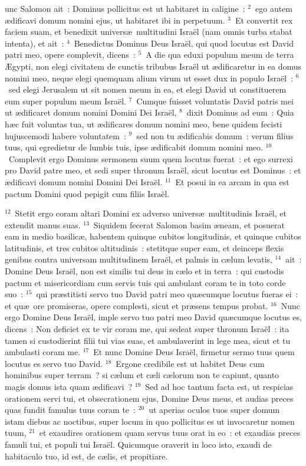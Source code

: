 \bchapter
{}unc Salomon ait~: Dominus pollicitus est ut habitaret in caligine~:
${}^{2}$~ego autem \ae dificavi domum nomini ejus, ut habitaret ibi in perpetuum.
${}^{3}$~Et convertit rex faciem suam, et benedixit univers\ae\ multitudini Isra\"el (nam omnis turba stabat intenta), et ait~:
${}^{4}$~Benedictus Dominus Deus Isra\"el, qui quod locutus est David patri meo, opere complevit, dicens~:
${}^{5}$~A die qua eduxi populum meum de terra \AE gypti, non elegi civitatem de cunctis tribubus Isra\"el ut \ae dificaretur in ea domus nomini meo, neque elegi quemquam alium virum ut esset dux in populo Isra\"el~:
${}^{6}$~sed elegi Jerusalem ut sit nomen meum in ea, et elegi David ut constituerem eum super populum meum Isra\"el.
${}^{7}$~Cumque fuisset voluntatis David patris mei ut \ae dificaret domum nomini Domini Dei Isra\"el,
${}^{8}$~dixit Dominus ad eum~: Quia h\ae c fuit voluntas tua, ut \ae dificares domum nomini meo, bene quidem fecisti hujuscemodi habere voluntatem~:
${}^{9}$~sed non tu \ae dificabis domum~: verum filius tuus, qui egredietur de lumbis tuis, ipse \ae dificabit domum nomini meo.
${}^{10}$~Complevit ergo Dominus sermonem suum quem locutus fuerat~: et ego surrexi pro David patre meo, et sedi super thronum Isra\"el, sicut locutus est Dominus~: et \ae dificavi domum nomini Domini Dei Isra\"el.
${}^{11}$~Et posui in ea arcam in qua est pactum Domini quod pepigit cum filiis Isra\"el.


${}^{12}$~Stetit ergo coram altari Domini ex adverso univers\ae\ multitudinis Isra\"el, et extendit manus suas.
${}^{13}$~Siquidem fecerat Salomon basim \ae neam, et posuerat eam in medio basilic\ae , habentem quinque cubitos longitudinis, et quinque cubitos latitudinis, et tres cubitos altitudinis~: stetitque super eam, et deinceps flexis genibus contra universam multitudinem Isra\"el, et palmis in c\ae lum levatis,
${}^{14}$~ait~: Domine Deus Isra\"el, non est similis tui deus in c\ae lo et in terra~: qui custodis pactum et misericordiam cum servis tuis qui ambulant coram te in toto corde suo~:
${}^{15}$~qui pr\ae stitisti servo tuo David patri meo qu\ae cumque locutus fueras ei~: et qu\ae\ ore promiseras, opere complesti, sicut et pr\ae sens tempus probat.
${}^{16}$~Nunc ergo Domine Deus Isra\"el, imple servo tuo patri meo David qu\ae cumque locutus es, dicens~: Non deficiet ex te vir coram me, qui sedeat super thronum Isra\"el~: ita tamen si custodierint filii tui vias suas, et ambulaverint in lege mea, sicut et tu ambulasti coram me.
${}^{17}$~Et nunc Domine Deus Isra\"el, firmetur sermo tuus quem locutus es servo tuo David.
${}^{18}$~Ergone credibile est ut habitet Deus cum hominibus super terram~? si c\ae lum et c\ae li c\ae lorum non te capiunt, quanto magis domus ista quam \ae dificavi~?
${}^{19}$~Sed ad hoc tantum facta est, ut respicias orationem servi tui, et obsecrationem ejus, Domine Deus meus, et audias preces quas fundit famulus tuus coram te~:
${}^{20}$~ut aperias oculos tuos super domum istam diebus ac noctibus, super locum in quo pollicitus es ut invocaretur nomen tuum,
${}^{21}$~et exaudires orationem quam servus tuus orat in eo~: et exaudias preces famuli tui, et populi tui Isra\"el. Quicumque oraverit in loco isto, exaudi de habitaculo tuo, id est, de c\ae lis, et propitiare.


